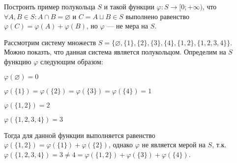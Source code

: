  \begin{task}{1}
Построить пример полукольца $S$ и такой функции $\varphi : S \to [0; +\infty)$, что $\forall A, B \in S: A \cap B  = \varnothing \text{ и } C = A \sqcup B \in S$
выполнено равенство  $\varphi(C) = \varphi(A) + \varphi(B)$, но $\varphi$ --- не мера на $S$.
\end{task}
\begin{solution}
Рассмотрим систему множеств $S = \{\varnothing, \{1\}, \{2\}, \{3\}, \{4\}, \{1, 2\}, \{1, 2, 3, 4\} \}$. Можно показть, что данная система является полукольцом. Определим на $S$ функцию $\varphi$ следующим образом:

$\varphi(\varnothing) = 0$

$\varphi(\{1\}) = \varphi(\{2\}) = \varphi(\{3\}) = \varphi(\{4\}) = 1$

$\varphi(\{1, 2\}) = 2$

$\varphi(\{1, 2, 3, 4\}) = 3$

Тогда для данной функции выполняется равенство $\varphi(\{1, 2\}) = \varphi(\{1\}) + \varphi(\{2\})$, однако $\varphi$ не является мерой на $S$, т.к. $\varphi(\{1, 2, 3, 4\}) = 3 \neq 4 = \varphi(\{1, 2\}) + \varphi(\{3\}) + \varphi(\{4\})$.
\end{solution}